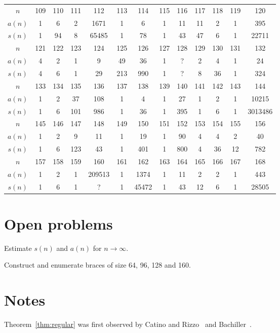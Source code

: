 \begin{table}[ht]
\begin{tabular}{|c|cccccccccccc|}
		\hline
		$n$ & 109 & 110 & 111 & 112 & 113 & 114 & 115 & 116 & 117 & 118 & 119 & 120\tabularnewline
		$a(n)$ & 1 & 6 & 2 & 1671 & 1 & 6 & 1 & 11 & 11 & 2 & 1 & 395\tabularnewline
		$s(n)$ & 1 & 94 &  8 & 65485 &  1 & 78 &  1 & 43 &  47 &  6 &  1 & 22711 \tabularnewline
		\hline

		$n$ & 121 & 122 & 123 & 124 & 125 & 126 & 127 & 128 & 129 & 130 & 131 & 132\tabularnewline
		$a(n)$ & 4 & 2 & 1 &  9  & 49 & 36 & 1 & ? & 2 &  4 & 1 & 24\tabularnewline
		$s(n)$ & 4 & 6 & 1 & 29 & 213 & 990 & 1 & ? & 8 & 36 & 1 & 324 \tabularnewline
		\hline

		$n$  & 133 & 134 & 135 & 136 & 137 & 138 & 139 & 140 & 141 & 142 & 143 & 144\tabularnewline
		$a(n)$ & 1 & 2 & 37 & 108 & 1 & 4 & 1 & 27 & 1 & 2 & 1 & 10215\tabularnewline
		$s(n)$ & 1 & 6 & 101 & 986 & 1 & 36 & 1 & 395 & 1 & 6 & 1 & 3013486 \tabularnewline
		\hline
		
		$n$ & 145 & 146 & 147 & 148 & 149 & 150 & 151 & 152 & 153 & 154 & 155 & 156\tabularnewline
		$a(n)$ & 1 & 2 & 9 & 11 & 1 & 19 & 1 & 90 & 4 & 4 & 2 & 40\tabularnewline
		$s(n)$ & 1 & 6 & 123 & 43 & 1 & 401 & 1 & 800 & 4 & 36 & 12 & 782 \tabularnewline
		\hline

		$n$ & 157 & 158 & 159 & 160 & 161 & 162 & 163 & 164 & 165 & 166 & 167 & 168\tabularnewline
		$a(n)$ & 1 & 2 & 1 & 209513 & 1 & 1374 & 1 & 11 & 2 & 2 & 1 & 443\tabularnewline
		$s(n)$ & 1 & 6 & 1 & ? & 1 & 45472 & 1 & 43 & 12 & 6 & 1 & 28505 \tabularnewline
		\hline
	\end{tabular}
	\label{tab:braces}
\end{table}

\section*{Open problems}

\begin{problem}
    Estimate $s(n)$ and $a(n)$ for $n\to\infty$.
\end{problem}

\begin{problem}
    Construct and enumerate braces of size 64, 96, 128 and 160. 
\end{problem}

\section*{Notes}

Theorem~\ref{thm:regular} was first observed by Catino and Rizzo~\cite{MR2486886} and Bachiller~\cite{MR3465351}. 

